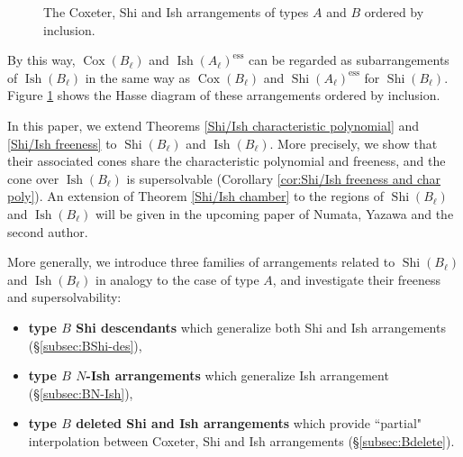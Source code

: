 \documentclass[11pt]{article}
\theoremstyle{definition}
\numberwithin{equation}{section}
\DeclareMathOperator{\Cox}{Cox}
\DeclareMathOperator{\Shi}{Shi}
\DeclareMathOperator{\Ish}{Ish}
\newcommand{\tbf}{\textbf}
\begin{document}
\begin{figure}[htbp!]
\centering
{}
\caption{The Coxeter, Shi and Ish arrangements of types $A$ and $B$ ordered by inclusion.}
\label{fig:Hasse shi ish}
\end{figure}

By this way, $\Cox(B_{\ell})$ and $\Ish(A_{\ell})^{\mathrm{ess}}$ can be regarded as subarrangements of $\Ish(B_{\ell})$ in the same way as $\Cox(B_{\ell})$ and $\Shi(A_{\ell})^{\mathrm{ess}}$ for $\Shi(B_{\ell})$. 
Figure \ref{fig:Hasse shi ish} shows the Hasse diagram of these arrangements ordered by inclusion.  

In this paper, we extend Theorems \ref{Shi/Ish characteristic polynomial} and \ref{Shi/Ish freeness} to $\Shi(B_{\ell})$ and $\Ish(B_{\ell})$. 
More precisely, we show that their associated cones share the characteristic polynomial and freeness, and the cone over  $\Ish(B_{\ell})$ is supersolvable (Corollary \ref{cor:Shi/Ish freeness and char poly}).  
An extension of Theorem \ref{Shi/Ish chamber} to the regions of $\Shi(B_\ell)$ and $\Ish(B_\ell)$ will be given in the upcoming paper  \cite{NTY} of Numata, Yazawa and the second author. 


 

More generally, we introduce three families of arrangements related to $\Shi(B_{\ell})$ and $\Ish(B_{\ell})$ in analogy to the case of type $A$, and investigate their freeness and supersolvability:
\begin{itemize}
\item \tbf{type $B$ Shi descendants} which generalize both Shi and Ish arrangements (\S\ref{subsec:BShi-des}), 
\item \tbf{type $B$ $N$-Ish arrangements} which generalize Ish arrangement (\S\ref{subsec:BN-Ish}), 
\item \tbf{type $B$ deleted Shi and Ish arrangements} which provide ``partial" interpolation between Coxeter, Shi and Ish arrangements (\S\ref{subsec:Bdelete}). 
\end{itemize}
\end{document}
